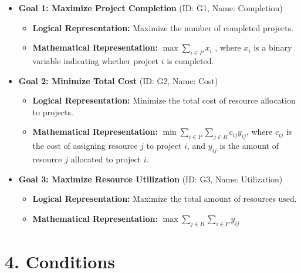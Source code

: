 \documentclass{article}
\begin{document}
\begin{itemize}
    \item \textbf{Goal 1: Maximize Project Completion} (ID: G1, Name: Completion)
    \begin{itemize}
        \item \textbf{Logical Representation:} Maximize the number of completed projects.
        \item \textbf{Mathematical Representation:} $\max \sum_{i \in P} x_i$ , where $x_i$ is a binary variable indicating whether project $i$ is completed.
    \end{itemize}
    \item \textbf{Goal 2: Minimize Total Cost} (ID: G2, Name: Cost)
    \begin{itemize}
        \item \textbf{Logical Representation:} Minimize the total cost of resource allocation to projects.
        \item \textbf{Mathematical Representation:} $\min \sum_{i \in P} \sum_{j \in R} c_{ij} y_{ij}$, where $c_{ij}$ is the cost of assigning resource $j$ to project $i$, and $y_{ij}$ is the amount of resource $j$ allocated to project $i$.
    \end{itemize}
    \item \textbf{Goal 3: Maximize Resource Utilization} (ID: G3, Name: Utilization)
    \begin{itemize}
        \item \textbf{Logical Representation:} Maximize the total amount of resources used.
        \item \textbf{Mathematical Representation:} $\max \sum_{j \in R} \sum_{i \in P} y_{ij}$
    \end{itemize}
\end{itemize}

\section{4. Conditions}
\end{document}

